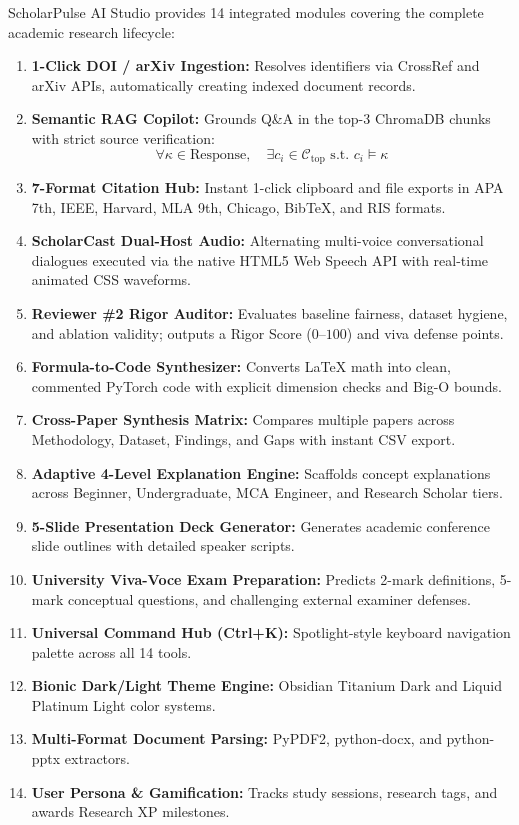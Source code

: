 \documentclass[conference]{IEEEtran}
\begin{document}
ScholarPulse AI Studio provides 14 integrated modules covering the complete academic research lifecycle:
\begin{enumerate}
    \item \textbf{1-Click DOI / arXiv Ingestion:} Resolves identifiers via CrossRef and arXiv APIs, automatically creating indexed document records.
    \item \textbf{Semantic RAG Copilot:} Grounds Q\&A in the top-3 ChromaDB chunks with strict source verification:
    \begin{equation}
    \forall \kappa \in \text{Response}, \quad \exists c_i \in \mathcal{C}_{\text{top}} \text{ s.t. } c_i \models \kappa
    \end{equation}
    \item \textbf{7-Format Citation Hub:} Instant 1-click clipboard and file exports in APA 7th, IEEE, Harvard, MLA 9th, Chicago, BibTeX, and RIS formats.
    \item \textbf{ScholarCast Dual-Host Audio:} Alternating multi-voice conversational dialogues executed via the native HTML5 Web Speech API with real-time animated CSS waveforms.
    \item \textbf{Reviewer \#2 Rigor Auditor:} Evaluates baseline fairness, dataset hygiene, and ablation validity; outputs a Rigor Score ($0$--$100$) and viva defense points.
    \item \textbf{Formula-to-Code Synthesizer:} Converts LaTeX math into clean, commented PyTorch code with explicit dimension checks and Big-O bounds.
    \item \textbf{Cross-Paper Synthesis Matrix:} Compares multiple papers across Methodology, Dataset, Findings, and Gaps with instant CSV export.
    \item \textbf{Adaptive 4-Level Explanation Engine:} Scaffolds concept explanations across Beginner, Undergraduate, MCA Engineer, and Research Scholar tiers.
    \item \textbf{5-Slide Presentation Deck Generator:} Generates academic conference slide outlines with detailed speaker scripts.
    \item \textbf{University Viva-Voce Exam Preparation:} Predicts 2-mark definitions, 5-mark conceptual questions, and challenging external examiner defenses.
    \item \textbf{Universal Command Hub (Ctrl+K):} Spotlight-style keyboard navigation palette across all 14 tools.
    \item \textbf{Bionic Dark/Light Theme Engine:} Obsidian Titanium Dark and Liquid Platinum Light color systems.
    \item \textbf{Multi-Format Document Parsing:} PyPDF2, python-docx, and python-pptx extractors.
    \item \textbf{User Persona \& Gamification:} Tracks study sessions, research tags, and awards Research XP milestones.
\end{enumerate}
\end{document}

